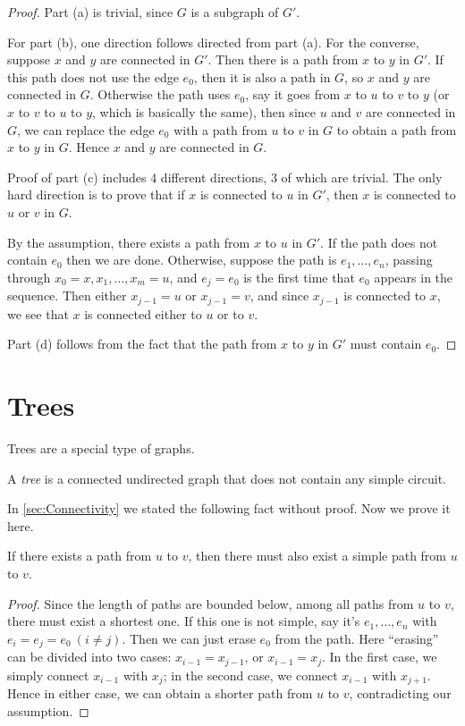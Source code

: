 \begin{proof}
    Part (a) is trivial, since $G$ is a subgraph of $G'$. 

    For part (b), one direction follows directed from part (a). For the converse, suppose $x$ and $y$ are connected in $G'$. Then there is a path from $x$ to $y$ in $G'$. If this path does not use the edge $e_0$, then it is also a path in $G$, so $x$ and $y$ are connected in $G$. Otherwise the path uses $e_0$, say it goes from $x$ to $u$ to $v$ to $y$ (or $x$ to $v$ to $u$ to $y$, which is basically the same), then since $u$ and $v$ are connected in $G$, we can replace the edge $e_0$ with a path from $u$ to $v$ in $G$ to obtain a path from $x$ to $y$ in $G$. Hence $x$ and $y$ are connected in $G$.

    Proof of part (c) includes 4 different directions, 3 of which are trivial. The only hard direction is to prove that if $x$ is connected to $u$ in $G'$, then $x$ is connected to $u$ or $v$ in $G$. 

    By the assumption, there exists a path from $x$ to $u$ in $G'$. If the path does not contain $e_0$ then we are done. Otherwise, suppose the path is $e_1,\dots,e_n$, passing through $x_0=x, x_1, \dots, x_m=u$, and $e_j=e_0$ is the first time that $e_0$ appears in the sequence. Then either $x_{j-1}=u$ or $x_{j-1}=v$, and since $x_{j-1}$ is connected to $x$, we see that $x$ is connected either to $u$ or to $v$. 

    Part (d) follows from the fact that the path from $x$ to $y$ in $G'$ must contain $e_0$. 
\end{proof}

\section{Trees}
Trees are a special type of graphs. 

\begin{definition}[Tree]
    A \emph{tree} is a connected undirected graph that does not contain any simple circuit.
\end{definition}

In \cref{sec:Connectivity} we stated the following fact without proof. Now we prove it here. 

\begin{lemma}
    If there exists a path from $u$ to $v$, then there must also exist a simple path from $u$ to $v$. 
\end{lemma}

\begin{proof}
    Since the length of paths are bounded below, among all paths from $u$ to $v$, there must exist a shortest one. If this one is not simple, say it's $e_1,\dots,e_n$ with $e_i=e_j=e_0\ (i\neq j)$. Then we can just erase $e_0$ from the path. Here ``erasing'' can be divided into two cases: $x_{i-1}=x_{j-1}$, or $x_{i-1}=x_j$. In the first case, we simply connect $x_{i-1}$ with $x_j$; in the second case, we connect $x_{i-1}$ with $x_{j+1}$. Hence in either case, we can obtain a shorter path from $u$ to $v$, contradicting our assumption. 
\end{proof}

